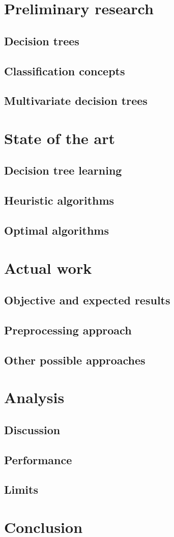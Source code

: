 \documentclass{report}
\begin{document}
\chapter{Preliminary research}
\section{Decision trees}
\section{Classification concepts} %
\section{Multivariate decision trees}


\chapter{State of the art}
\section{Decision tree learning} %
\section{Heuristic algorithms}
\section{Optimal algorithms}


\chapter{Actual work}
\section{Objective and expected results}
\section{Preprocessing approach}
\section{Other possible approaches}


\chapter{Analysis}
\section{Discussion}
\section{Performance}
\section{Limits}


\chapter*{Conclusion}




\cite{multivariate-explaining} \cite{blossom} \cite{murtree} \cite{wiki-decision-tree}
\end{document}
